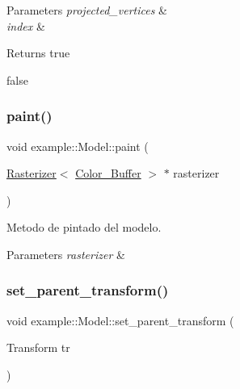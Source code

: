 \begin{DoxyParams}{Parameters}
{\em projected\+\_\+vertices} & \\
\hline
{\em index} & \\
\hline
\end{DoxyParams}
\begin{DoxyReturn}{Returns}
true 

false 
\end{DoxyReturn}
\mbox{\label{classexample_1_1_model_aeadfa130f9617b18f11d992ea2dc07ed}} 
\subsubsection{\texorpdfstring{paint()}{paint()}}
{\footnotesize\ttfamily void example\+::\+Model\+::paint (\begin{DoxyParamCaption}\item[{\mbox{\hyperlink{classexample_1_1_rasterizer}{Rasterizer}}$<$ \mbox{\hyperlink{classexample_1_1_color___buffer___rgba8888}{Color\+\_\+\+Buffer}} $>$ $\ast$}]{rasterizer }\end{DoxyParamCaption})}



Metodo de pintado del modelo. 


\begin{DoxyParams}{Parameters}
{\em rasterizer} & \\
\hline
\end{DoxyParams}
\mbox{\label{classexample_1_1_model_a965eaf2f978ae6703ee30d61c0d9174d}} 
\subsubsection{\texorpdfstring{set\_parent\_transform()}{set\_parent\_transform()}}
{\footnotesize\ttfamily void example\+::\+Model\+::set\+\_\+parent\+\_\+transform (\begin{DoxyParamCaption}\item[{Transform}]{tr }\end{DoxyParamCaption})\hspace{0.3cm}{\ttfamily [inline]}}



